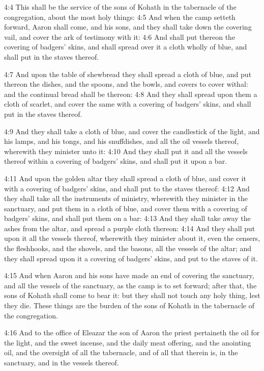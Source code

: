 4:4 This shall be the service of the sons of Kohath in the tabernacle of the congregation, about the most holy things: 4:5 And when the camp setteth forward, Aaron shall come, and his sons, and they shall take down the covering vail, and cover the ark of testimony with it: 4:6 And shall put thereon the covering of badgers' skins, and shall spread over it a cloth wholly of blue, and shall put in the staves thereof.

4:7 And upon the table of shewbread they shall spread a cloth of blue, and put thereon the dishes, and the spoons, and the bowls, and covers to cover withal: and the continual bread shall be thereon: 4:8 And they shall spread upon them a cloth of scarlet, and cover the same with a covering of badgers' skins, and shall put in the staves thereof.

4:9 And they shall take a cloth of blue, and cover the candlestick of the light, and his lamps, and his tongs, and his snuffdishes, and all the oil vessels thereof, wherewith they minister unto it: 4:10 And they shall put it and all the vessels thereof within a covering of badgers' skins, and shall put it upon a bar.

4:11 And upon the golden altar they shall spread a cloth of blue, and cover it with a covering of badgers' skins, and shall put to the staves thereof: 4:12 And they shall take all the instruments of ministry, wherewith they minister in the sanctuary, and put them in a cloth of blue, and cover them with a covering of badgers' skins, and shall put them on a bar: 4:13 And they shall take away the ashes from the altar, and spread a purple cloth thereon: 4:14 And they shall put upon it all the vessels thereof, wherewith they minister about it, even the censers, the fleshhooks, and the shovels, and the basons, all the vessels of the altar; and they shall spread upon it a covering of badgers' skins, and put to the staves of it.

4:15 And when Aaron and his sons have made an end of covering the sanctuary, and all the vessels of the sanctuary, as the camp is to set forward; after that, the sons of Kohath shall come to bear it: but they shall not touch any holy thing, lest they die. These things are the burden of the sons of Kohath in the tabernacle of the congregation.

4:16 And to the office of Eleazar the son of Aaron the priest pertaineth the oil for the light, and the sweet incense, and the daily meat offering, and the anointing oil, and the oversight of all the tabernacle, and of all that therein is, in the sanctuary, and in the vessels thereof.

